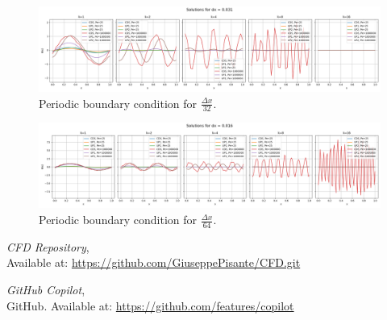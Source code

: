 \documentclass{article}
\begin{document}
\begin{figure}[h!]
    \centering
    \includegraphics[width=1\textwidth]{task5_dx_32.png}
    \caption{Periodic boundary condition for \(\frac{\Delta x}{32}\).}
    \label{fig:periodic_dx_32}
\end{figure}

\begin{figure}[h!]
    \centering
    \includegraphics[width=1\textwidth]{task5_dx_64.png}
    \caption{Periodic boundary condition for \(\frac{\Delta x}{64}\).}
    \label{fig:periodic_dx_64}
\end{figure}

\begin{thebibliography}{9}
  \textit{CFD Repository},\\
  Available at: \url{https://github.com/GiuseppePisante/CFD.git}
  
  \textit{GitHub Copilot},\\
  GitHub. Available at: \url{https://github.com/features/copilot}

\end{thebibliography}
\end{document}
